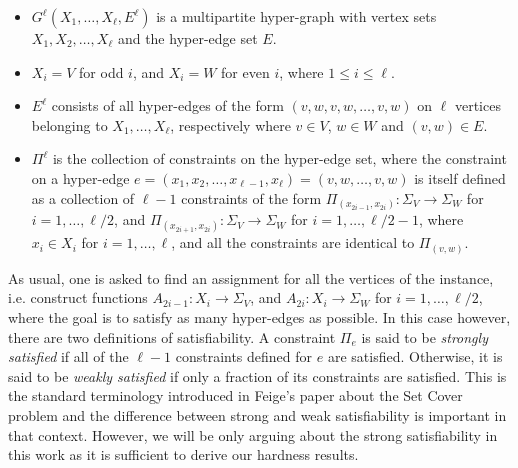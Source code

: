 \documentclass[11pt]{article}
\begin{document}
\begin{itemize}
\item $G^{\ell}(X_1, \hdots, X_{\ell},E^{\ell})$ is a multipartite
hyper-graph with vertex sets $X_1, X_2, \hdots, X_{\ell}$ and the
hyper-edge set $E$. \vspace{1mm}

\item $X_i = V$ for odd $i$, and $X_i = W$ for even $i$, where
$1 \leq i \leq \ell$. \vspace{1mm}

\item $E^{\ell}$ consists of all hyper-edges of the form
$(v,w,v,w,\hdots,v,w)$ on $\ell$ vertices belonging to $X_1, \hdots, X_{\ell}$,
respectively where $v \in V$, $w \in W$ and $(v,w) \in E$.

\item $\Pi^{\ell}$ is the collection of constraints on the
hyper-edge set, where the constraint on a hyper-edge
$e=(x_1,x_2,\hdots,x_{\ell-1},x_{\ell})=(v,w,\hdots,v,w)$ is itself
defined as a collection of $\ell-1$ constraints of the form
$\Pi_{(x_{2i-1},x_{2i})}\colon \Sigma_V \rightarrow \Sigma_W$ for $i=1,\hdots,\ell/2$, and
$\Pi_{(x_{2i+1},x_{2i})}\colon \Sigma_V \rightarrow \Sigma_W$ for $i=1,\hdots,\ell/2-1$, where
$x_i \in X_i$ for $i=1,\hdots,\ell$, and all the constraints are
identical to $\Pi_{(v,w)}$.
\end{itemize}

As usual, one is asked to find an assignment for all the
vertices of the instance, i.e. construct functions
$A_{2i-1}\colon X_i \rightarrow \Sigma_V$, and
$A_{2i}\colon X_i \rightarrow \Sigma_W$ for $i=1, \hdots, \ell/2$,
where the goal is to satisfy as many hyper-edges as possible.
In this case however, there are two definitions of
satisfiability. A constraint $\Pi_e$ is said to be
\emph{strongly satisfied} if all of the $\ell-1$ constraints
defined for $e$ are satisfied. Otherwise, it is said to be
\emph{weakly satisfied} if only a fraction of its constraints
are satisfied. This is the standard terminology introduced in
Feige's paper about the Set Cover problem \cite{Feige} and
the difference between strong and weak satisfiability is
important in that context. However, we will be only arguing
about the strong satisfiability in this work as it is sufficient
to derive our hardness results.
\end{document}
